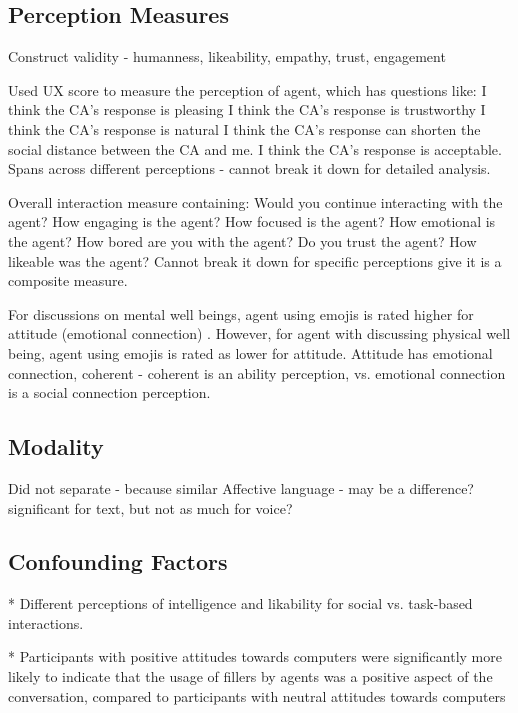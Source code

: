 \documentclass[sigconf,screen,review, anonymous]{acmart}
\newcommand{\cmt}[1]{}%
\begin{document}
\subsection{Perception Measures}

Construct validity - humanness, likeability, empathy, trust, engagement

Used UX score to measure the perception of agent, which has questions like:
I think the CA's response is pleasing
I think the CA's response is trustworthy
I think the CA's response is natural
I think the CA's response can shorten the social distance between the CA and me.
I think the CA's response is acceptable.
Spans across different perceptions - cannot break it down for detailed analysis. \cite{ma2022ask}\cmt{[29]}

Overall interaction measure containing: 
Would you continue interacting with the agent?
How engaging is the agent?
How focused is the agent?
How emotional is the agent?
How bored are you with the agent?
Do you trust the agent?
How likeable was the agent?
Cannot break it down for specific perceptions give it is a composite measure. \cite{hoegen2019end}\cmt{[31]}

For discussions on mental well beings, agent using emojis is rated higher for attitude (emotional connection) . However, for agent with discussing physical well being, agent using emojis is rated as lower for attitude. 
Attitude has emotional connection, coherent - coherent is an ability perception, vs. emotional connection is a social connection perception. \cite{fadhil2018effect}\cmt{[52]}

\subsection{Modality}

Did not separate - because similar 
Affective language - may be a difference? significant for text, but not as much for voice?

\subsection{Confounding Factors}

* Different perceptions of intelligence and likability for social vs. task-based interactions. \cite{jeong2019exploring}\cmt{[10]}

* Participants with positive attitudes towards computers were significantly more likely to indicate that the usage of fillers by agents was a positive aspect of the conversation, compared to participants with neutral attitudes towards computers \cite{pfeifer2009should}\cmt{[12]}
\end{document}
